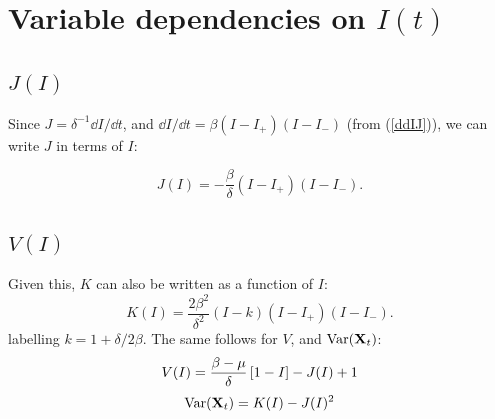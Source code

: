 \section{Variable dependencies on $I(t)$}


\subsection{$J(I)$}

Since $J = \delta^{-1}{\dd I}/{\dd t} $, and ${\dd I}/{\dd t} =  \beta (I - I_+)(I-I_-)$ (from (\ref{ddIJ})), we can write $J$ in terms of $I$:

\begin{equation*}
J(I) = -\frac{\beta}{\delta}  (I - I_+)(I-I_-).
\end{equation*}


\subsection{$V(I)$}


Given this, $K$ can also be written as a function of $I$:
\begin{equation*}
K(I) = \frac{2\beta^2}{\delta^2}(I-k)(I - I_+)(I-I_-).
\end{equation*}
labelling $k = 1+ \delta/2\beta$. The same follows for $V$, and $\text{Var}({{\bf X}_t})$:
\begin{equation*}
V(I) = \frac{\beta - \mu}{\delta}\left[1-I\right] - J(I) + 1
\end{equation*}
\begin{equation*}
\text{Var}({{\bf X}_t}) = K(I) - J(I)^2
\end{equation*}
